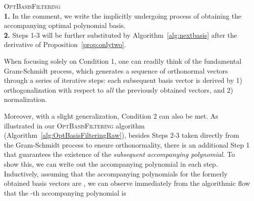 \begin{algorithm}[t]
    \SetAlgoNoLine
    \caption{
        \textsc{OptBasisFiltering} \\ 
        {
          \footnotesize 
          \linespread{0.8} 
          \textbf{1.} In the comment, we write the implicitly undergoing process of obtaining the accompanying optimal polynomial basis.
          \\
          \textbf{2.} Steps 1-3 will be further substituted by Algorithm~\ref{alg:nextbasis} after the derivative of Proposition~\ref{prop:onlytwo}. 
}
    }
    \Parameter{}
    \BlankLine
    \label{alg:OptBasisFilteringRaw}
\end{algorithm} 

When focusing solely on Condition 1, one can readily think of the fundamental Gram-Schmidt process,   
which generates a sequence of orthonormal vectors through a series of iterative steps: each subsequent basis vector is derived by 1) orthogonalization with respect to \textit{all} the previously obtained vectors, and 2) normalization. 

Moreover, with a slight generalization, Condition 2 can also be met. 
As illustrated in our \textsc{OptBasisFiltering} algorithm (Algorithm~\ref{alg:OptBasisFilteringRaw}), 
besides Steps 2-3 taken directly from the Gram-Schmidt process to ensure orthonormality, 
there is an additional Step 1 that guarantees the existence of the \textit{subsequent accompanying polynomial}.
To show this, we can write out the accompanying polynomial in each step. 
Inductively, assuming that the accompanying polynomials 
for the formerly obtained basis vectors are , 
we can observe immediately from the algorithmic flow that the -th 
accompanying polynomial is

